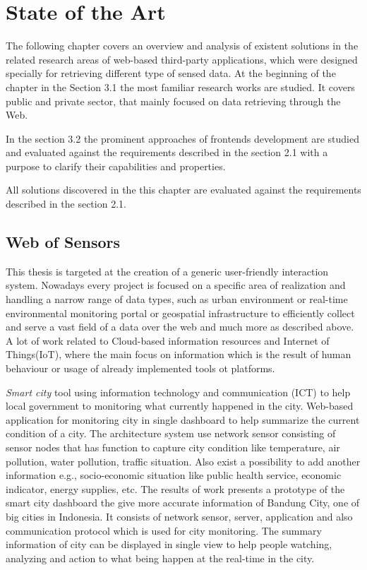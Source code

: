 \chapter{State of the Art}
The following chapter covers an overview and analysis of existent solutions in the related research areas of web-based third-party applications, which were designed specially for retrieving different type of sensed data. At the beginning of the chapter in the Section 3.1 the most familiar research works are studied. It covers public and private sector, that mainly focused on data retrieving through the Web.

In the section 3.2 the prominent approaches of frontends development are studied and evaluated against the requirements described in the section 2.1 with a purpose to clarify their capabilities and properties.  

All solutions discovered in the this chapter are evaluated against the requirements described in the section 2.1.

\section{Web of Sensors}
 This thesis is targeted at the creation of a generic user-friendly interaction system. Nowadays every project is focused on a specific area of realization and handling a narrow range of data types, such as urban environment\cite{song2010real} or real-time environmental monitoring portal or geospatial infrastructure to efficiently collect and serve a vast field of a data over the web\cite{6588063} and much more as described above. A lot of work related to Cloud-based information resources and Internet of Things(IoT), where the main focus on information which is the result of human behaviour or usage of already implemented tools ot platforms.  

	\emph{Smart city}\cite{6588063} tool using information technology and communication (ICT) to help local government to monitoring what currently happened in the city. Web-based application for monitoring city in single dashboard to help summarize the current condition of a city. The architecture system use network sensor consisting of sensor nodes that has function to capture city condition like temperature, air pollution, water pollution, traffic situation. Also exist a possibility to add another information e.g., socio-economic situation like public health service, economic indicator, energy supplies, etc. The results of work presents a prototype of the smart city dashboard the give more accurate information of Bandung City, one of big cities in Indonesia. It consists of network sensor, server, application and also communication protocol which is used for city monitoring. The summary information of city can be displayed in single view to help people watching, analyzing and action to what being happen at the real-time in the city.

